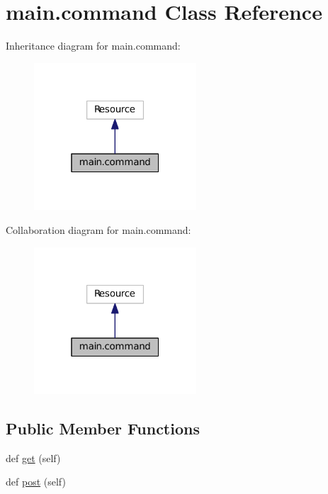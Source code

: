 \hypertarget{classmain_1_1command}{}\section{main.\+command Class Reference}
\label{classmain_1_1command}


Inheritance diagram for main.\+command\+:
\nopagebreak
\begin{figure}[H]
\begin{center}
\leavevmode
\includegraphics[width=172pt]{classmain_1_1command__inherit__graph}
\end{center}
\end{figure}


Collaboration diagram for main.\+command\+:
\nopagebreak
\begin{figure}[H]
\begin{center}
\leavevmode
\includegraphics[width=172pt]{classmain_1_1command__coll__graph}
\end{center}
\end{figure}
\subsection*{Public Member Functions}
\begin{DoxyCompactItemize}
\item 
def \hyperlink{classmain_1_1command_a45d94d28b30ca81f482a4bca1bb3bc96}{get} (self)
\item 
def \hyperlink{classmain_1_1command_aad57d3ca75e00b96364b4dd9971f8d34}{post} (self)
\end{DoxyCompactItemize}


